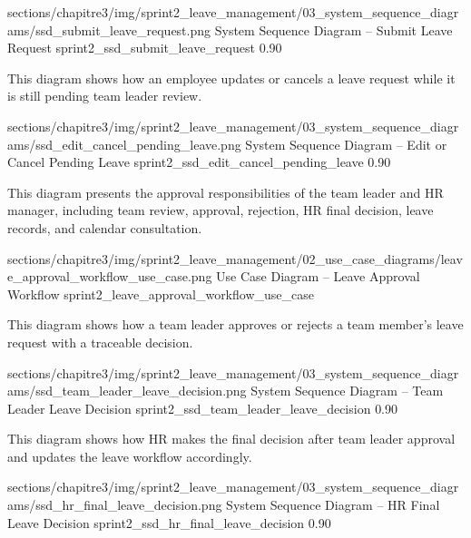 \ChapterThreeFigureSized
{sections/chapitre3/img/sprint2_leave_management/03_system_sequence_diagrams/ssd_submit_leave_request.png}
{System Sequence Diagram -- Submit Leave Request}
{sprint2_ssd_submit_leave_request}
{0.90}

\Needspace{7.2cm}

\noindent This diagram shows how an employee updates or cancels a leave request while it is still pending team leader review.\par

\ChapterThreeFigureSized
{sections/chapitre3/img/sprint2_leave_management/03_system_sequence_diagrams/ssd_edit_cancel_pending_leave.png}
{System Sequence Diagram -- Edit or Cancel Pending Leave}
{sprint2_ssd_edit_cancel_pending_leave}
{0.90}

\Needspace{8.5cm}

\noindent This diagram presents the approval responsibilities of the team leader and HR manager, including team review, approval, rejection, HR final decision, leave records, and calendar consultation.\par

\ChapterThreeFigure
{sections/chapitre3/img/sprint2_leave_management/02_use_case_diagrams/leave_approval_workflow_use_case.png}
{Use Case Diagram -- Leave Approval Workflow}
{sprint2_leave_approval_workflow_use_case}

\Needspace{7.2cm}

\noindent This diagram shows how a team leader approves or rejects a team member's leave request with a traceable decision.\par

\ChapterThreeFigureSized
{sections/chapitre3/img/sprint2_leave_management/03_system_sequence_diagrams/ssd_team_leader_leave_decision.png}
{System Sequence Diagram -- Team Leader Leave Decision}
{sprint2_ssd_team_leader_leave_decision}
{0.90}

\Needspace{7.2cm}

\noindent This diagram shows how HR makes the final decision after team leader approval and updates the leave workflow accordingly.\par

\ChapterThreeFigureSized
{sections/chapitre3/img/sprint2_leave_management/03_system_sequence_diagrams/ssd_hr_final_leave_decision.png}
{System Sequence Diagram -- HR Final Leave Decision}
{sprint2_ssd_hr_final_leave_decision}
{0.90}

